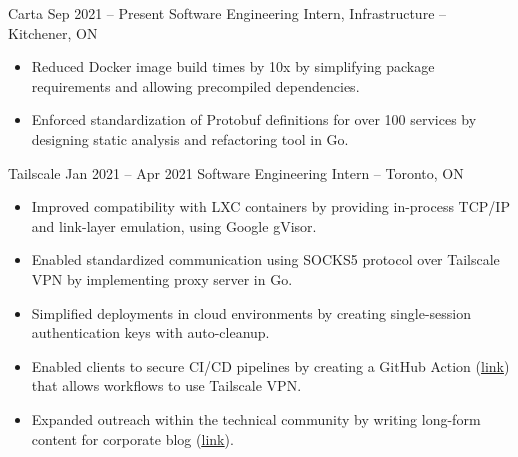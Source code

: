 \documentclass{article}
\begin{document}
\normalsize
\WorkEntry
{Carta}
{Sep 2021 -- Present}
{Software Engineering Intern, Infrastructure -- Kitchener, ON}
{
\begin{itemize} \itemsep -1pt
    \item Reduced Docker image build times by 10x by simplifying package requirements and allowing precompiled dependencies.
    \item Enforced standardization of Protobuf definitions for over 100 services by designing static analysis and refactoring tool in Go.
\end{itemize}
}
\iffalse
Made Tailscale ready for the cloud, by creating features that allowed it to run in lightweight, unprivileged container environments. This included a virtual networking stack for connecting to the Tailscale network without kernel privileges to create a network driver, a SOCKS5 proxy to allow applications to communicate over this virtual networking stack, and ephemeral authentication keys for stateless access to the Tailscale network. Also published long-form technical content on company blog (https://tailscale.com/blog/2021-05-github-actions-and-tailscale/) and contributed to product knowledge base.
\fi
\WorkEntry
{Tailscale}
{Jan 2021 -- Apr 2021}
{Software Engineering Intern -- Toronto, ON}
{\begin{itemize} \itemsep -1pt
    \item Improved compatibility with LXC containers by providing in-process TCP/IP and link-layer emulation, using Google gVisor.
    \item Enabled standardized communication using SOCKS5 protocol over Tailscale VPN by implementing proxy server in Go.
    \item Simplified deployments in cloud environments by creating single-session authentication keys with auto-cleanup.
    \item Enabled clients to secure CI/CD pipelines by creating a GitHub Action (\underline{\href{https://github.com/tailscale/github-action}{link}}) that allows workflows to use Tailscale VPN. %
    \item Expanded outreach within the technical community by writing long-form content for corporate blog (\underline{\href{https://tailscale.com/blog/2021-05-github-actions-and-tailscale/}{link}}).
    \end{itemize}}
\vspace{1mm}
\end{document}
